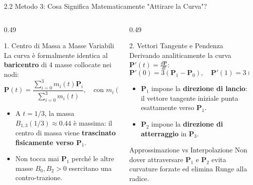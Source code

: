 \documentclass[aspectratio=169, 10pt]{beamer}
\begin{document}
\begin{frame}{2.2 Metodo 3: Cosa Significa Matematicamente "Attirare la Curva"?}
    \begin{columns}[T]
        \begin{column}{0.49\textwidth}
            \begin{block}{1. Centro di Massa a Masse Variabili}
                La curva è formalmente identica al \textbf{baricentro} di 4 masse collocate nei nodi:
                $$\mathbf{P}(t) = \frac{\sum_{i=0}^3 m_i(t) \mathbf{P}_i}{\sum_{i=0}^3 m_i(t)}, \quad \text{con } m_i(t) = B_{i,3}(t)$$
                \footnotesize
                \begin{itemize}
                    \item A $t=1/3$, la massa $B_{1,3}(1/3) \approx 0.44$ è massima: il centro di massa viene \textbf{trascinato fisicamente verso $\mathbf{P}_1$}.
                    \item Non tocca mai $\mathbf{P}_1$ perché le altre masse $B_0, B_2 > 0$ esercitano una contro-trazione.
                \end{itemize}
            \end{block}
        \end{column}
        \begin{column}{0.49\textwidth}
            \begin{exampleblock}{2. Vettori Tangente e Pendenza}
                Derivando analiticamente la curva $\mathbf{P}'(t) = \frac{d\mathbf{P}}{dt}$:
                $$\mathbf{P}'(0) = 3(\mathbf{P}_1 - \mathbf{P}_0), \quad \mathbf{P}'(1) = 3(\mathbf{P}_3 - \mathbf{P}_2)$$
                \footnotesize
                \begin{itemize}
                    \item $\mathbf{P}_1$ impone la \textbf{direzione di lancio}: il vettore tangente iniziale punta esattamente verso $\mathbf{P}_1$.
                    \item $\mathbf{P}_2$ impone la \textbf{direzione di atterraggio} in $\mathbf{P}_3$.
                \end{itemize}
            \end{exampleblock}
            \begin{alertblock}{Approssimazione vs Interpolazione}
                \footnotesize Non dover attraversare $\mathbf{P}_1$ e $\mathbf{P}_2$ evita curvature forzate ed elimina Runge alla radice.
            \end{alertblock}
        \end{column}
    \end{columns}
\end{frame}
\end{document}
